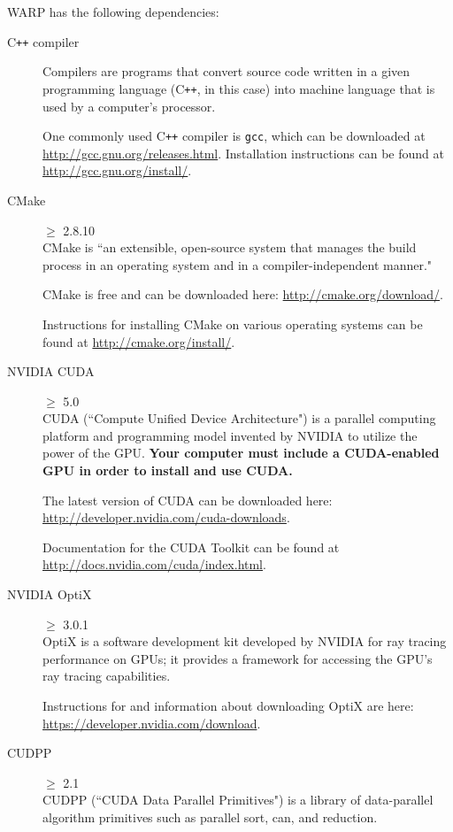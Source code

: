\documentclass[twoside,a4paper]{refart}
\begin{document}
WARP has the following dependencies:

\begin{description}

\item[C\texttt{++} compiler]
Compilers are programs that convert source code written in a given programming language (C\texttt{++}, in 
this case) into machine language that is used by a computer's processor.

One commonly used C\texttt{++} compiler is \texttt{gcc}, which can be downloaded at 
\url{http://gcc.gnu.org/releases.html}. Installation instructions can be found at 
\url{http://gcc.gnu.org/install/}.

\item[CMake]$\ge$ 2.8.10 \\
CMake is ``an extensible, open-source system that manages the build process in an operating system and in
a compiler-independent manner."

CMake is free and can be downloaded here: \url{http://cmake.org/download/}.

Instructions for installing CMake on various operating systems can be found at 
\url{http://cmake.org/install/}.
  
\item[NVIDIA CUDA]$\ge$ 5.0 \\
CUDA (``Compute Unified Device Architecture") is a parallel computing platform and programming model 
invented by NVIDIA to utilize the power of the GPU. \textbf{Your computer must include a CUDA-enabled 
GPU in order to install and use CUDA.}

The latest version of CUDA can be downloaded here: \url{http://developer.nvidia.com/cuda-downloads}.

Documentation for the CUDA Toolkit can be found at \url{http://docs.nvidia.com/cuda/index.html}.

\item[NVIDIA OptiX]$\ge$ 3.0.1 \\
OptiX is a software development kit developed by NVIDIA for ray tracing performance on GPUs; it provides a
framework for accessing the GPU's ray tracing capabilities.

Instructions for and information about downloading OptiX are here: \url{https://developer.nvidia.com/download}.

\item[CUDPP]$\ge$ 2.1 \\
CUDPP (``CUDA Data Parallel Primitives") is a library of data-parallel algorithm primitives such as 
parallel sort, can, and reduction.


\end{description}
\end{document}
